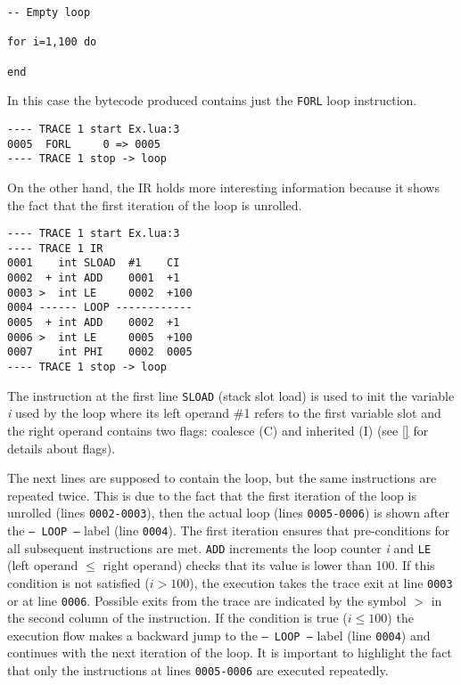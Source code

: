\begin{mdframed}[style=LuaStyleFrame]
\begin{lstlisting}[style=LuaStyle]
-- Empty loop

for i=1,100 do

end
\end{lstlisting}
\end{mdframed}

\noindent
In this case the bytecode produced contains just the \texttt{FORL} loop instruction.

\begin{lstlisting}[style=DumpStyle]
---- TRACE 1 start Ex.lua:3
0005  FORL     0 => 0005
---- TRACE 1 stop -> loop
\end{lstlisting}

\noindent
On the other hand, the IR holds more interesting information because it shows the fact that the first iteration of the loop is unrolled.

\begin{lstlisting}[style=DumpStyle]
---- TRACE 1 start Ex.lua:3
---- TRACE 1 IR
0001    int SLOAD  #1    CI
0002  + int ADD    0001  +1  
0003 >  int LE     0002  +100
0004 ------ LOOP ------------
0005  + int ADD    0002  +1  
0006 >  int LE     0005  +100
0007    int PHI    0002  0005
---- TRACE 1 stop -> loop
\end{lstlisting}

\noindent
The instruction at the first line \texttt{SLOAD} (stack slot load) is used to init the variable \textit{i} used by the loop where its left operand \#1 refers to the first variable slot and the right operand contains two flags: coalesce (C) and inherited (I) (see \ref{} for details about flags).

The next lines are supposed to contain the loop, but the same instructions are repeated twice. This is due to the fact that the first iteration of the loop is unrolled (lines \texttt{0002-0003}), then the actual loop (lines \texttt{0005-0006}) is shown after the \texttt{-- LOOP --} label (line \texttt{0004}). The first iteration ensures that pre-conditions for all subsequent instructions are met. \texttt{ADD} increments the loop counter \textit{i} and \texttt{LE} (left operand $\leq$ right operand) checks that its value is lower than 100. If this condition is not satisfied ($i>100$), the execution takes the trace exit at line \texttt{0003} or at line \texttt{0006}. Possible exits from the trace are indicated by the symbol $>$ in the second column of the instruction. If the condition is true ($i\leq100$) the execution flow makes a backward jump to the \texttt{-- LOOP --} label (line \texttt{0004}) and continues with the next iteration of the loop. It is important to highlight the fact that only the instructions at lines \texttt{0005-0006} are executed repeatedly.

